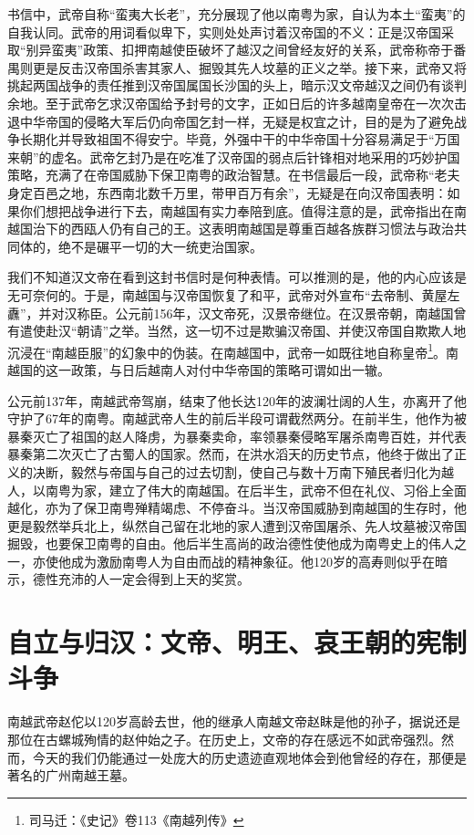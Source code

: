 书信中，武帝自称“蛮夷大长老”，充分展现了他以南粤为家，自认为本土“蛮夷”的自我认同。武帝的用词看似卑下，实则处处声讨着汉帝国的不义：正是汉帝国采取“别异蛮夷”政策、扣押南越使臣破坏了越汉之间曾经友好的关系，武帝称帝于番禺则更是反击汉帝国杀害其家人、掘毁其先人坟墓的正义之举。接下来，武帝又将挑起两国战争的责任推到汉帝国属国长沙国的头上，暗示汉文帝越汉之间仍有谈判余地。至于武帝乞求汉帝国给予封号的文字，正如日后的许多越南皇帝在一次次击退中华帝国的侵略大军后仍向帝国乞封一样，无疑是权宜之计，目的是为了避免战争长期化并导致祖国不得安宁。毕竟，外强中干的中华帝国十分容易满足于“万国来朝”的虚名。武帝乞封乃是在吃准了汉帝国的弱点后针锋相对地采用的巧妙护国策略，充满了在帝国威胁下保卫南粤的政治智慧。在书信最后一段，武帝称“老夫身定百邑之地，东西南北数千万里，带甲百万有余”，无疑是在向汉帝国表明：如果你们想把战争进行下去，南越国有实力奉陪到底。值得注意的是，武帝指出在南越国治下的西瓯人仍有自己的王。这表明南越国是尊重百越各族群习惯法与政治共同体的，绝不是碾平一切的大一统吏治国家。

我们不知道汉文帝在看到这封书信时是何种表情。可以推测的是，他的内心应该是无可奈何的。于是，南越国与汉帝国恢复了和平，武帝对外宣布“去帝制、黄屋左纛”，并对汉称臣。公元前156年，汉文帝死，汉景帝继位。在汉景帝朝，南越国曾有遣使赴汉“朝请”之举。当然，这一切不过是欺骗汉帝国、并使汉帝国自欺欺人地沉浸在“南越臣服”的幻象中的伪装。在南越国中，武帝一如既往地自称皇帝\footnote{司马迁：《史记》卷113《南越列传》}。南越国的这一政策，与日后越南人对付中华帝国的策略可谓如出一辙。

公元前137年，南越武帝驾崩，结束了他长达120年的波澜壮阔的人生，亦离开了他守护了67年的南粤。南越武帝人生的前后半段可谓截然两分。在前半生，他作为被暴秦灭亡了祖国的赵人降虏，为暴秦卖命，率领暴秦侵略军屠杀南粤百姓，并代表暴秦第二次灭亡了古蜀人的国家。然而，在洪水滔天的历史节点，他终于做出了正义的决断，毅然与帝国与自己的过去切割，使自己与数十万南下殖民者归化为越人，以南粤为家，建立了伟大的南越国。在后半生，武帝不但在礼仪、习俗上全面越化，亦为了保卫南粤殚精竭虑、不停奋斗。当汉帝国威胁到南越国的生存时，他更是毅然举兵北上，纵然自己留在北地的家人遭到汉帝国屠杀、先人坟墓被汉帝国掘毁，也要保卫南粤的自由。他后半生高尚的政治德性使他成为南粤史上的伟人之一，亦使他成为激励南粤人为自由而战的精神象征。他120岁的高寿则似乎在暗示，德性充沛的人一定会得到上天的奖赏。

\section{自立与归汉：文帝、明王、哀王朝的宪制斗争}

南越武帝赵佗以120岁高龄去世，他的继承人南越文帝赵眜是他的孙子，据说还是那位在古螺城殉情的赵仲始之子。在历史上，文帝的存在感远不如武帝强烈。然而，今天的我们仍能通过一处庞大的历史遗迹直观地体会到他曾经的存在，那便是著名的广州南越王墓。

